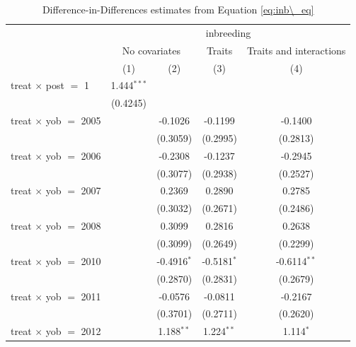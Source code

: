 
\begin{table}[htbp]
   \caption{\label{tab:table1} Difference-in-Differences estimates from Equation \ref{eq:inb\_eq}}
   \bigskip
   \centering
   \begin{tabular}{lcccc}
      \toprule
       & \multicolumn{4}{c}{inbreeding}\\
       & \multicolumn{2}{c}{No covariates} & Traits & Traits and interactions \\ 
                                     & (1)           & (2)           & (3)           & (4)\\  
      \midrule 
      treat $\times$ post $=$ 1      & 1.444$^{***}$ &               &               &   \\   
                                     & (0.4245)      &               &               &   \\   
      treat $\times$ yob $=$ 2005    &               & -0.1026       & -0.1199       & -0.1400\\   
                                     &               & (0.3059)      & (0.2995)      & (0.2813)\\   
      treat $\times$ yob $=$ 2006    &               & -0.2308       & -0.1237       & -0.2945\\   
                                     &               & (0.3077)      & (0.2938)      & (0.2527)\\   
      treat $\times$ yob $=$ 2007    &               & 0.2369        & 0.2890        & 0.2785\\   
                                     &               & (0.3032)      & (0.2671)      & (0.2486)\\   
      treat $\times$ yob $=$ 2008    &               & 0.3099        & 0.2816        & 0.2638\\   
                                     &               & (0.3099)      & (0.2649)      & (0.2299)\\   
      treat $\times$ yob $=$ 2010    &               & -0.4916$^{*}$ & -0.5181$^{*}$ & -0.6114$^{**}$\\   
                                     &               & (0.2870)      & (0.2831)      & (0.2679)\\   
      treat $\times$ yob $=$ 2011    &               & -0.0576       & -0.0811       & -0.2167\\   
                                     &               & (0.3701)      & (0.2711)      & (0.2620)\\   
      treat $\times$ yob $=$ 2012    &               & 1.188$^{**}$  & 1.224$^{**}$  & 1.114$^{*}$\\   

\end{tabular}
\end{table}
